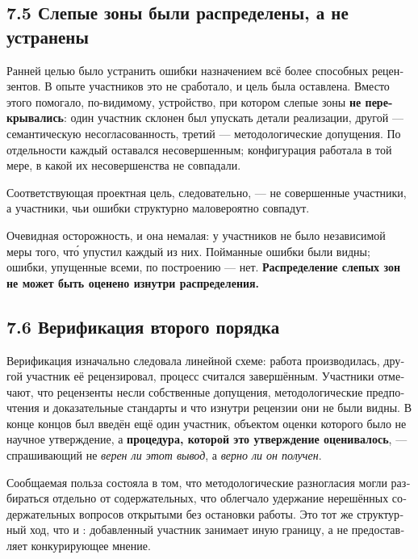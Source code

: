 \begin{russian}
\subsection*{7.5 Слепые зоны были распределены, а не устранены}
\label{sec:ru:7.5}

Ранней целью было устранить ошибки назначением всё более способных рецензентов. В опыте участников это не сработало, и цель была оставлена. Вместо этого помогало, по-видимому, устройство, при котором слепые зоны \textbf{не перекрывались}: один участник склонен был упускать детали реализации, другой — семантическую несогласованность, третий — методологические допущения. По отдельности каждый оставался несовершенным; конфигурация работала в той мере, в какой их несовершенства не совпадали.

Соответствующая проектная цель, следовательно, — не совершенные участники, а участники, чьи ошибки структурно маловероятно совпадут.

Очевидная осторожность, и она немалая: у участников не было независимой меры того, что́ упустил каждый из них. Пойманные ошибки были видны; ошибки, упущенные всеми, по построению — нет. \textbf{Распределение слепых зон не может быть оценено изнутри распределения.}


\subsection*{7.6 Верификация второго порядка}
\label{sec:ru:7.6}

Верификация изначально следовала линейной схеме: работа производилась, другой участник её рецензировал, процесс считался завершённым. Участники отмечают, что рецензенты несли собственные допущения, методологические предпочтения и доказательные стандарты и что изнутри рецензии они не были видны. В конце концов был введён ещё один участник, объектом оценки которого было не научное утверждение, а \textbf{процедура, которой это утверждение оценивалось}, — спрашивающий не \emph{верен ли этот вывод}, а \emph{верно ли он получен}.

Сообщаемая польза состояла в том, что методологические разногласия могли разбираться отдельно от содержательных, что облегчало удержание нерешённых содержательных вопросов открытыми без остановки работы. Это тот же структурный ход, что и : добавленный участник занимает иную границу, а не предоставляет конкурирующее мнение.



\end{russian}
